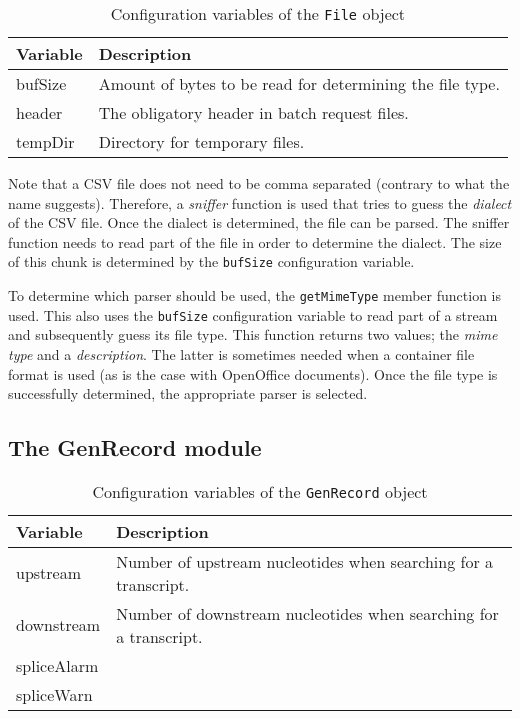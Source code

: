 \documentclass{article}
\begin{document}
\begin{table}[H]
\begin{center}
\begin{tabular}{l|l}
Variable & Description \\
\hline
bufSize  & Amount of bytes to be read for determining the file type. \\
header   & The obligatory header in batch request files. \\
tempDir  & Directory for temporary files.
\end{tabular}
\caption{Configuration variables of the \texttt{File} object} 
\label{tab:fileconfig}
\end{center}
\end{table}

Note that a CSV file does not need to be comma separated (contrary to what the
name suggests). Therefore, a \emph{sniffer} function is used that tries to
guess the \emph{dialect} of the CSV file. Once the dialect is determined, the
file can be parsed. The sniffer function needs to read part of the file in
order to determine the dialect. The size of this chunk is determined by the
\texttt{bufSize} configuration variable.

To determine which parser should be used, the \texttt{getMimeType} member
function is used. This also uses the \texttt{bufSize} configuration variable to
read part of a stream and subsequently guess its file type. This function
returns two values; the \emph{mime type} and a \emph{description}. The latter
is sometimes needed when a container file format is used (as is the case with
OpenOffice documents). Once the file type is successfully determined, the 
appropriate parser is selected.

\subsection{The GenRecord module} \label{subsec:genrecord}

\begin{table}[H]
\begin{center}
\begin{tabular}{l|p{9cm}}
Variable    & Description \\
\hline
upstream    & Number of upstream nucleotides when searching for a 
              transcript. \\ 
downstream  & Number of downstream nucleotides when searching for a 
              transcript. \\ 
spliceAlarm & \\ 
spliceWarn  &
\end{tabular}
\caption{Configuration variables of the \texttt{GenRecord} object} 
\label{tab:genrecordconfig}
\end{center}
\end{table}
\end{document}
